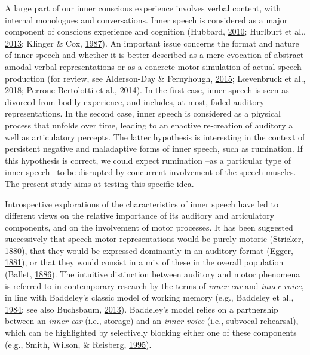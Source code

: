 \documentclass[a4paper,12pt,twoside,openright,oldfontcommands,final]{memoir}
\begin{document}
A large part of our inner conscious experience involves verbal content, with internal monologues and conversations. Inner speech is considered as a major component of conscious experience and cognition (Hubbard, \protect\hyperlink{ref-hubbard_auditory_2010}{2010}; Hurlburt et al., \protect\hyperlink{ref-Hurlburt2013}{2013}; Klinger \& Cox, \protect\hyperlink{ref-klinger_dimensions_1987}{1987}). An important issue concerns the format and nature of inner speech and whether it is better described as a mere evocation of abstract amodal verbal representations or as a concrete motor simulation of actual speech production (for review, see Alderson-Day \& Fernyhough, \protect\hyperlink{ref-alderson-day_inner_2015}{2015}; Lœvenbruck et al., \protect\hyperlink{ref-loevenbruck_cognitive_2018}{2018}; Perrone-Bertolotti et al., \protect\hyperlink{ref-Perrone-Bertolotti2014}{2014}). In the first case, inner speech is seen as divorced from bodily experience, and includes, at most, faded auditory representations. In the second case, inner speech is considered as a physical process that unfolds over time, leading to an enactive re-creation of auditory a well as articulatory percepts. The latter hypothesis is interesting in the context of persistent negative and maladaptive forms of inner speech, such as rumination. If this hypothesis is correct, we could expect rumination --as a particular type of inner speech-- to be disrupted by concurrent involvement of the speech muscles. The present study aims at testing this specific idea.

Introspective explorations of the characteristics of inner speech have led to different views on the relative importance of its auditory and articulatory components, and on the involvement of motor processes. It has been suggested successively that speech motor representations would be purely motoric (Stricker, \protect\hyperlink{ref-stricker_studien_1880}{1880}), that they would be expressed dominantly in an auditory format (Egger, \protect\hyperlink{ref-egger_parole_1881}{1881}), or that they would consist in a mix of these in the overall population (Ballet, \protect\hyperlink{ref-ballet_langage_1886}{1886}). The intuitive distinction between auditory and motor phenomena is referred to in contemporary research by the terms of \emph{inner ear} and \emph{inner voice}, in line with Baddeley's classic model of working memory (e.g., Baddeley et al., \protect\hyperlink{ref-baddeley_exploring_1984}{1984}; see also Buchsbaum, \protect\hyperlink{ref-buchsbaum_role_2013}{2013}). Baddeley's model relies on a partnership between an \emph{inner ear} (i.e., storage) and an \emph{inner voice} (i.e., subvocal rehearsal), which can be highlighted by selectively blocking either one of these components (e.g., Smith, Wilson, \& Reisberg, \protect\hyperlink{ref-smith_role_1995}{1995}).
\end{document}
